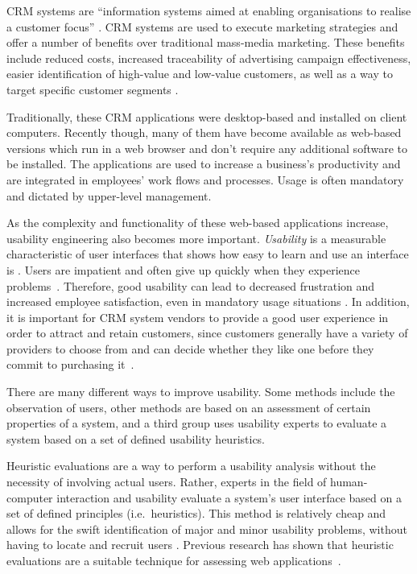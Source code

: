 CRM systems are ``information systems aimed at enabling organisations to realise a customer focus'' \citep[p.\ 592]{Bull2003}. CRM systems are used to execute marketing strategies and offer a number of benefits over traditional mass-media marketing. These benefits include reduced costs, increased traceability of advertising campaign effectiveness, easier identification of high-value and low-value customers, as well as a way to target specific customer segments \citep[p.\ 8]{Brown2000}.

Traditionally, these CRM applications were desktop-based and installed on client computers. Recently though, many of them have become available as web-based versions which run in a web browser and don't require any additional software to be installed. The applications are used to increase a business's productivity and are integrated in employees' work flows and processes. Usage is often mandatory and dictated by upper-level management.

As the complexity and functionality of these web-based applications increase, usability engineering also becomes more important. \textit{Usability} is a measurable characteristic of user interfaces that shows how easy to learn and use an interface is \citep{Mayhew1999}. Users are impatient and often give up quickly when they experience problems~\citep{Najjar2011,Nielsen2000}. Therefore, good usability can lead to decreased frustration and increased employee satisfaction, even in mandatory usage situations \citep{Hsiehforthcoming}. In addition, it is important for CRM system vendors to provide a good user experience in order to attract and retain customers, since customers generally have a variety of providers to choose from and can decide whether they like one before they commit to purchasing it~\citep{Nielsen2000,Hasan2009}.

There are many different ways to improve usability. Some methods include the observation of users, other methods are based on an assessment of certain properties of a system, and a third group uses usability experts to evaluate a system based on a set of defined usability heuristics.

Heuristic evaluations are a way to perform a usability analysis without the necessity of involving actual users. Rather, experts in the field of human-computer interaction and usability evaluate a system's user interface based on a set of defined principles (i.e.\ heuristics). This method is relatively cheap and allows for the swift identification of major and minor usability problems, without having to locate and recruit users \citep{Nielsen1993}. Previous research has shown that heuristic evaluations are a suitable technique for assessing web applications~\citep{Sharp2007,Nielsen2000,Ssemugabi2010}.

